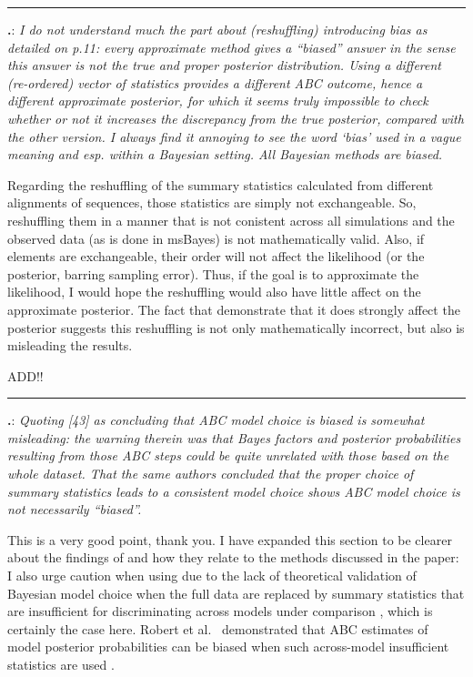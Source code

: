 \documentclass[12pt]{article}
\newcounter{commentCounter}
\newcommand{\revcomment}[1]{{\addtocounter{commentCounter}{1}}
    \medskip \hrule \noindent
\textbf{\arabic{section}.\arabic{commentCounter}}: {\sl #1}\par\xspace}
\newcommand{\response}[1]{{\addtolength{\leftskip}{0.25in} #1\par}\xspace}
\let\quoteOld\quote
\let\endquoteOld\endquote
\renewenvironment{quote}{\sffamily\small\quoteOld}{\endquoteOld}
\begin{document}
\revcomment{
    I do not understand much the part about (reshuffling) introducing bias as
    detailed on p.11: every approximate method gives a ``biased'' answer in the
    sense this answer is not the true and proper posterior distribution. Using
    a different (re-ordered) vector of statistics provides a different ABC
    outcome, hence a different approximate posterior, for which it seems truly
    impossible to check whether or not it increases the discrepancy from the
    true posterior, compared with the other version. I always find it annoying
    to see the word `bias' used in a vague meaning and esp. within a Bayesian
    setting. All Bayesian methods are biased.
}
\response{
    Regarding the reshuffling of the summary statistics calculated from
    different alignments of sequences, those statistics are simply not
    exchangeable. So, reshuffling them in a manner that is not conistent across
    all simulations and the observed data (as is done in msBayes) is not
    mathematically valid. Also, if elements are exchangeable, their order will
    not affect the likelihood (or the posterior, barring sampling error). Thus,
    if the goal is to approximate the likelihood, I would hope the reshuffling
    would also have little affect on the approximate posterior. The fact that
    \cite{Huang2011} demonstrate that it does strongly affect the posterior
    suggests this reshuffling is not only mathematically incorrect, but also is
    misleading the results.

    ADD!!
}

\revcomment{
    Quoting [43] as concluding that ABC model choice is biased is
    somewhat misleading: the warning therein was that Bayes factors and
    posterior probabilities resulting from those ABC steps could be quite
    unrelated with those based on the whole dataset. That the same authors
    concluded that the proper choice of summary statistics leads to a
    consistent model choice shows ABC model choice is not necessarily
    ``biased''.
}
\response{
    This is a very good point, thank you. I have expanded this section
    to be clearer about the findings of \cite{Robert2011} and how they
    relate to the methods discussed in the paper:
    \begin{quote}
        I also urge caution when using \dppmsbayes due to the lack of
        theoretical validation of Bayesian model choice when the full data are
        replaced by summary statistics that are insufficient for discriminating
        across models under comparison \cite{Robert2011}, which is certainly
        the case here.  Robert et al.\ \cite{Robert2011} demonstrated that ABC
        estimates of model posterior probabilities can be biased when such
        across-model insufficient statistics are used \cite{Robert2011}.
    \end{quote}
}
\end{document}
